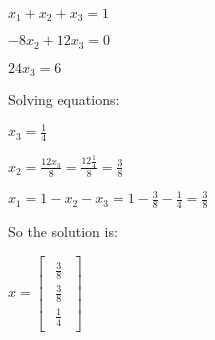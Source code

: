 \singlespacing

$x_1 + x_2 + x_3 = 1$

\singlespacing

$-8x_2 + 12x_3 = 0$

\singlespacing

$24x_3 = 6$

\singlespacing

Solving equations:

\singlespacing

$x_3 = \frac{1}{4}$

\singlespacing

$x_2 = \frac{12x_3}{8} = \frac{12\frac{1}{4}}{8} = \frac{3}{8}$

\singlespacing

$x_1 = 1 - x_2 - x_3 = 1 - \frac{3}{8} - \frac{1}{4} = \frac{3}{8}$

\singlespacing

So the solution is:

\singlespacing

{
    \renewcommand{\arraystretch}{1.5}
    \begin{math}
        x = \begin{bmatrix}
            \begin{array}{c}
                \frac{3}{8} \\
                \frac{3}{8} \\
                \frac{1}{4}
            \end{array}
        \end{bmatrix}\quad
        \begin{array}{c}
        \end{array}
    \end{math}
}